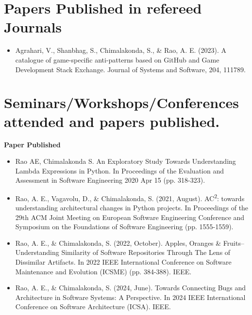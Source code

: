 \documentclass[12pt,table,xcdraw]{article}
\begin{document}
\section{Papers Published in refereed Journals}
\begin{itemize}
    \item Agrahari, V., Shanbhag, S., Chimalakonda, S., \& Rao, A. E. (2023). A catalogue of game-specific anti-patterns based on GitHub and Game Development Stack Exchange. Journal of Systems and Software, 204, 111789.
\end{itemize}

\section{Seminars/Workshops/Conferences attended and papers published.}
\textbf{Paper Published}
\begin{itemize}
    \item Rao AE, Chimalakonda S. An Exploratory Study Towards Understanding Lambda Expressions in Python. In Proceedings of the Evaluation and Assessment in Software Engineering 2020 Apr 15 (pp. 318-323).
    \item Rao, A. E., Vagavolu, D., \& Chimalakonda, S. (2021, August). AC\textsuperscript{2}: towards understanding architectural changes in Python projects. In Proceedings of the 29th ACM Joint Meeting on European Software Engineering Conference and Symposium on the Foundations of Software Engineering (pp. 1555-1559).
    \item Rao, A. E., \& Chimalakonda, S. (2022, October). Apples, Oranges \& Fruits–Understanding Similarity of Software Repositories Through The Lens of Dissimilar Artifacts. In 2022 IEEE International Conference on Software Maintenance and Evolution (ICSME) (pp. 384-388). IEEE.
    \item Rao, A. E., \& Chimalakonda, S. (2024, June). Towards Connecting Bugs and Architecture in Software Systems: A Perspective. In 2024 IEEE International Conference on Software Architecture (ICSA). IEEE.
\end{itemize}
\end{document}
